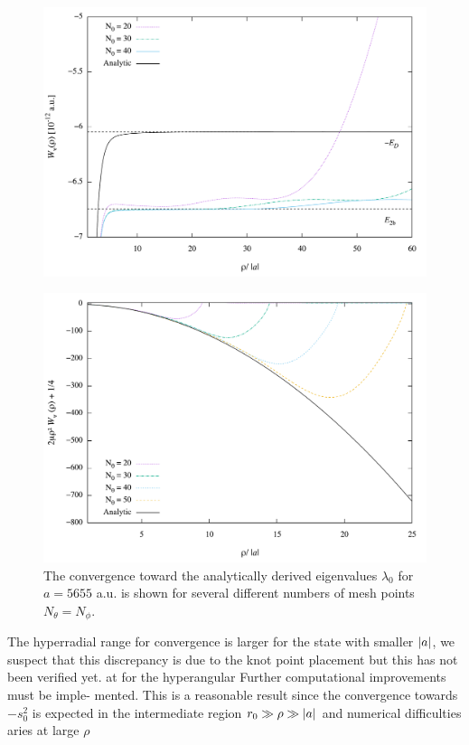 \begin{figure}
	\includegraphics[width=\linewidth]{twobodyenergy.pdf}
	\caption{}
	\label{fig:twobody}
\end{figure}

\begin{figure}
	\includegraphics[width=\linewidth]{convergence5.pdf}
	\caption{The convergence toward the analytically derived eigenvalues $\lambda_0$ for $a=5655$ a.u. is shown for several different numbers of mesh points $N_{\theta}=N_{\phi}$.}
	\label{fig:conv_pos5}
\end{figure}


The hyperradial range for convergence is larger for the state with smaller $\lvert a\rvert$, we suspect that this discrepancy is due to the knot point placement but this has not been verified yet. 
at for the hyperangular Further computational improvements must be imple- mented. This is a reasonable result since the convergence towards $-s_0^2$ is expected in the intermediate region $r_0 \gg \rho \gg \lvert a\rvert$ and numerical difficulties aries at large $\rho$  



